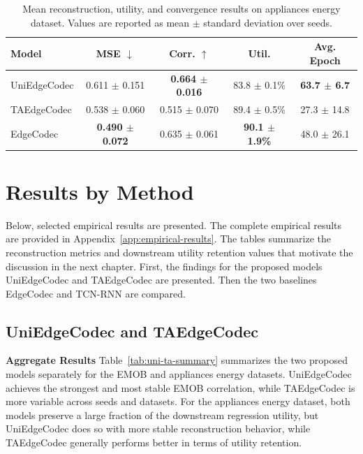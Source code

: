 \begin{table}[htbp]
\centering
\small
\caption{Mean reconstruction, utility, and convergence results on appliances energy dataset. Values are reported as mean $\pm$ standard deviation over seeds.}
\label{tab:key-findings-appliances}
\begin{tabular}{lcccc}
\toprule
\textbf{Model} & \textbf{MSE} $\downarrow$ & \textbf{Corr.} $\uparrow$ & \textbf{Util.} & \textbf{Avg. Epoch} \\
\midrule
UniEdgeCodec & 0.611 $\pm$ 0.151 & \textbf{0.664 $\pm$ 0.016} & 83.8 $\pm$ 0.1\% & \textbf{63.7 $\pm$ 6.7} \\
TAEdgeCodec  & 0.538 $\pm$ 0.060 & 0.515 $\pm$ 0.070 & 89.4 $\pm$ 0.5\% & 27.3 $\pm$ 14.8 \\
EdgeCodec    & \textbf{0.490 $\pm$ 0.072} & 0.635 $\pm$ 0.061 & \textbf{90.1 $\pm$ 1.9\%} & 48.0 $\pm$ 26.1 \\
\bottomrule
\end{tabular}
\end{table}

\section{Results by Method}

Below, selected empirical results are presented. The complete empirical results are provided in Appendix~\ref{app:empirical-results}. The tables summarize the reconstruction metrics and downstream utility retention values that motivate the discussion in the next chapter. First, the findings for the proposed models UniEdgeCodec and TAEdgeCodec are presented. Then the two baselines EdgeCodec and TCN-RNN are compared. 

\subsection{UniEdgeCodec and TAEdgeCodec}

\textbf{Aggregate Results} Table~\ref{tab:uni-ta-summary} summarizes the two proposed models separately for the EMOB and appliances energy datasets. UniEdgeCodec achieves the strongest and most stable EMOB correlation, while TAEdgeCodec is more variable across seeds and datasets. For the appliances energy dataset, both models preserve a large fraction of the downstream regression utility, but UniEdgeCodec does so with more stable reconstruction behavior, while TAEdgeCodec generally performs better in terms of utility retention.

